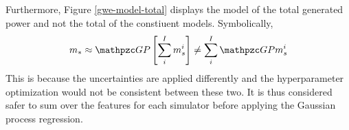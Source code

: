 Furthermore, Figure \ref{gwe-model-total} displays the model of the total generated
power and not the total of the constiuent models. Symbolically, 
\begin{equation}
\label{total-model}
m_* \approx \GP \left[\sum_i^I m_s^i\right] \ne \sum_i^I \GP m_s^i
\end{equation}
This is because the uncertainties are applied differently and the hyperparameter
optimization would not be consistent between these two. It is thus considered safer
to sum over the features for each simulator before applying the Gaussian process
regression.

